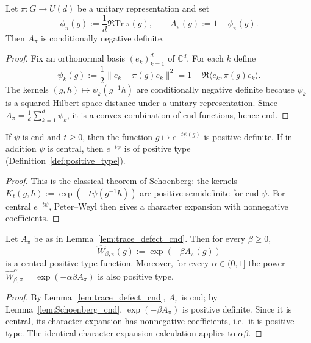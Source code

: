 \begin{lemma}\label{lem:trace_defect_cnd}
Let $\pi:G\to U(d)$ be a unitary representation and set
\[
\phi_\pi(g):=\frac{1}{d}\Re\mathrm{Tr}\,\pi(g),
\qquad
A_\pi(g):=1-\phi_\pi(g).
\]
Then $A_\pi$ is conditionally negative definite.
\end{lemma}
\begin{proof}
Fix an orthonormal basis $(e_k)_{k=1}^d$ of $\mathbb C^d$.
For each $k$ define
\[
\psi_k(g):=\frac12\|e_k-\pi(g)e_k\|^2 = 1-\Re\langle e_k,\pi(g)e_k\rangle.
\]
The kernels $(g,h)\mapsto \psi_k(g^{-1}h)$ are conditionally negative definite because $\psi_k$ is a squared Hilbert-space distance under a unitary representation.
Since $A_\pi=\frac1d\sum_{k=1}^d \psi_k$, it is a convex combination of cnd functions, hence cnd.
\end{proof}

\begin{lemma}[Schoenberg]\label{lem:Schoenberg_cnd}
If $\psi$ is cnd and $t\ge0$, then the function $g\mapsto e^{-t\psi(g)}$ is positive definite.
If in addition $\psi$ is central, then $e^{-t\psi}$ is of positive type (Definition~\ref{def:positive_type}).
\end{lemma}
\begin{proof}

This is the classical theorem of Schoenberg: the kernels $K_t(g,h):=\exp(-t\psi(g^{-1}h))$ are positive semidefinite for cnd $\psi$.
For central $e^{-t\psi}$, Peter--Weyl then gives a character expansion with nonnegative coefficients.
\end{proof}

\begin{corollary}\label{cor:Wilson_positive_type}
Let $A_\pi$ be as in Lemma~\ref{lem:trace_defect_cnd}. Then for every $\beta\ge0$,
\[
\widehat W_{\beta,\pi}(g):=\exp(-\beta A_\pi(g))
\]
is a central positive-type function. Moreover, for every $\alpha\in(0,1]$ the power $\widehat W_{\beta,\pi}^\alpha=\exp(-\alpha\beta A_\pi)$ is also positive type.
\end{corollary}
\begin{proof}
By Lemma~\ref{lem:trace_defect_cnd}, $A_\pi$ is cnd; by Lemma~\ref{lem:Schoenberg_cnd}, $\exp(-\beta A_\pi)$ is positive definite.
Since it is central, its character expansion has nonnegative coefficients, i.e.\ it is positive type. The identical character-expansion calculation applies to $\alpha\beta$.
\end{proof}


